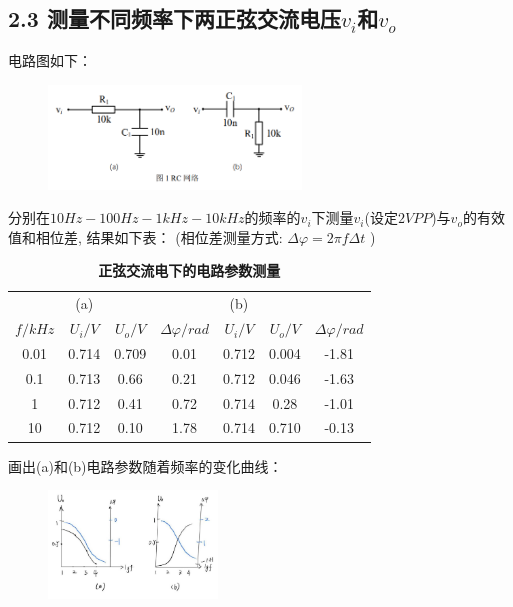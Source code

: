 \documentclass[UTF8]{ctexart}
\begin{document}
\subsection*{2.3 测量不同频率下两正弦交流电压$v_i$和$v_o$}
电路图如下：
\begin{figure}[htbp]
    \centering
    \includegraphics[width=0.60\textwidth]{3-电路图.png}
\end{figure}

分别在$10Hz-100Hz-1kHz-10kHz$的频率的$v_i$下测量$v_i$(设定$2VPP$)与$v_o$的有效值和相位差,
结果如下表：
(相位差测量方式: $\Delta \varphi = 2 \pi f \Delta t$ )

\begin{table}[H]
    \centering
    \caption{\label{表3}\textbf{正弦交流电下的电路参数测量}}
    \begin{tabular}{cccc|ccc}
    \toprule
                & (a)     &         &                           & (b)     &         &                           \\
        $f/kHz$ & $U_i/V$ & $U_o/V$ &  $\Delta \varphi / rad$ & $U_i/V$ & $U_o/V$ &  $\Delta \varphi / rad$ \\
    \midrule
        0.01 & 0.714 & 0.709 & 0.01 & 0.712 & 0.004& -1.81\\
        0.1  & 0.713 & 0.66 & 0.21 & 0.712 & 0.046 & -1.63\\
        1    & 0.712 & 0.41 & 0.72 & 0.714 & 0.28 & -1.01\\
        10   & 0.712 & 0.10 & 1.78 & 0.714 & 0.710 & -0.13\\

    \bottomrule
    \end{tabular}
\end{table}

画出(a)和(b)电路参数随着频率的变化曲线：

\begin{figure}[htbp]
    \centering
    \includegraphics[width=0.40\textwidth]{2-3频率特性.jpg}
\end{figure}
\end{document}
